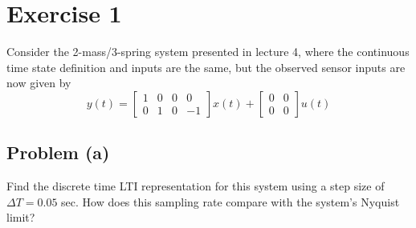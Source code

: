 \documentclass[11pt]{article}
\begin{document}
\thispagestyle{empty}

\newlength{\boxlength}\setlength{\boxlength}{\textwidth}
\addtolength{\boxlength}{-4mm}

\begin{center}
\end{center}

\section*{Exercise 1}
Consider the 2-mass/3-spring system presented in lecture 4, where the continuous time state definition and inputs are the same, but the observed sensor inputs are now given by 
\begin{equation*}
	y(t) = \begin{bmatrix} 1 & 0 & 0 & 0 \\ 0 & 1 & 0 & -1 \end{bmatrix}x(t) + \begin{bmatrix} 0 & 0 \\ 0 & 0 \end{bmatrix} u(t)
\end{equation*}

\subsection*{Problem (a)}
Find the discrete time LTI representation for this system using a step size of $\Delta T = 0.05$ sec. How does this sampling rate compare with the system's Nyquist limit?
\end{document}
